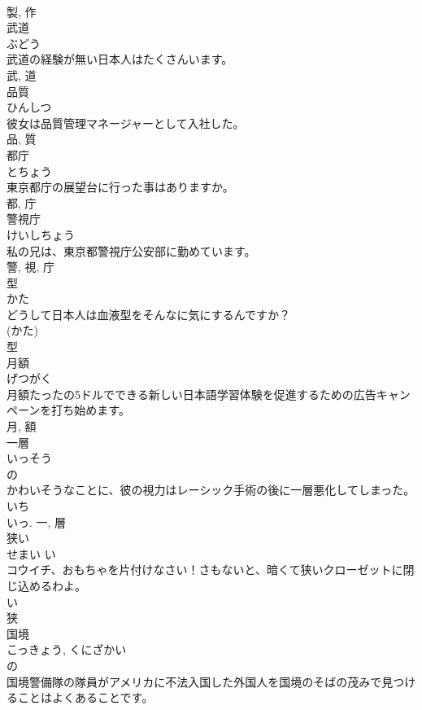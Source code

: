 \documentclass[8pt]{extreport}
\begin{document}
\begin{CJK}{UTF8}{min}
\\	製, 作	
\\	武道	
\\	ぶどう	
\\	武道の経験が無い日本人はたくさんいます。	
\\	武, 道	
\\	品質	
\\	ひんしつ	
\\	彼女は品質管理マネージャーとして入社した。	
\\	品, 質	
\\	都庁	
\\	とちょう	
\\	東京都庁の展望台に行った事はありますか。	
\\	都, 庁	
\\	警視庁	
\\	けいしちょう	
\\	私の兄は、東京都警視庁公安部に勤めています。	
\\	警, 視, 庁	
\\	型	
\\	かた	
\\	どうして日本人は血液型をそんなに気にするんですか？	
\\	(かた) 
\\	型	
\\	月額	
\\	げつがく	
\\	月額たったの5ドルでできる新しい日本語学習体験を促進するための広告キャンペーンを打ち始めます。	
\\	月, 額	
\\	一層	
\\	いっそう	
\\	の 
\\	かわいそうなことに、彼の視力はレーシック手術の後に一層悪化してしまった。	
\\	いち 
\\	いっ.	一, 層	
\\	狭い	
\\	せまい	い 
\\	コウイチ、おもちゃを片付けなさい！さもないと、暗くて狭いクローゼットに閉じ込めるわよ。	
\\	い 
\\	狭	
\\	国境	
\\	こっきょう, くにざかい	
\\	の 
\\	国境警備隊の隊員がアメリカに不法入国した外国人を国境のそばの茂みで見つけることはよくあることです。	

\end{CJK}
\end{document}
